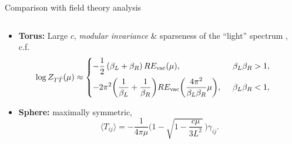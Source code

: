 \documentclass[
	10pt
	,noamsthm
]{beamer}
\begin{document}
\begin{frame}{Comparison with field theory analysis}{%
	\textcite{Datta:2018thy,Apolo:2023aho}
}
\begin{columns}
\begin{column}{\textwidth}
\vspace{-.3\baselineskip}
\begin{itemize}
\item \textbf{Torus:} Large $c$, \textit{modular invariance} \& sparseness of the ``light'' spectrum \cite{Datta:2018thy,Apolo:2023aho},
	c.f. \textcite{Hartman:2014oaa}
	\begin{equation*}
	\hspace{-1.5em}
		\log   Z_{T\bar T}(\mu)  \approx \left\{ \begin{aligned}
		& {-\frac{1}{2}}\,(\beta_L + \beta_R)\, RE_{\text{vac}}(\mu),  &\beta_L \beta_R > 1, \\
		& {-2 \pi^2 \bigg(\frac{1}{\beta_L} + \frac{1}{\beta_R}\bigg)  RE_{\text{vac}}\bigg(\frac{4\pi^2}{\beta_L \beta_R} \mu \bigg)}, \ \, &\beta_L\beta_R < 1, %
		 \end{aligned} \right. %
	\end{equation*}
	
\item \textbf{Sphere:} maximally symmetric, \textcite{Donnelly:2018bef}
	\begin{equation}
		\langle T_{ij}\rangle =-\frac{1}{4\pi\mu} \bigg(1-\sqrt{1-\frac{c\mu}{3L^2}}\, \bigg)  \gamma_{ij}.
	\end{equation}
\end{itemize}
\end{column}
\end{columns}
\end{frame}
\end{document}
